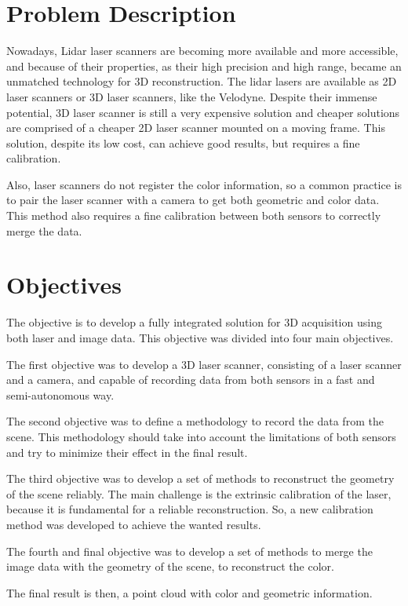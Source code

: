 \section{Problem Description}

Nowadays, Lidar laser scanners are becoming more available and more accessible,  and because of their properties, as their high precision and high range, became an unmatched technology for 3D reconstruction. The lidar lasers are available as 2D laser scanners or 3D laser scanners, like the Velodyne. Despite their immense potential, 3D laser scanner is still a very expensive solution and cheaper solutions are comprised of a cheaper 2D laser scanner mounted on a moving frame. This solution, despite its low cost, can achieve good results, but requires a fine calibration. 

Also, laser scanners do not register the color information, so a common practice is to pair the laser scanner with a camera to get both geometric and color data. This method also requires a fine calibration between both sensors to correctly merge the data. 

\section{Objectives}

The objective is to develop a fully integrated solution for 3D acquisition using both laser and image data. This objective was divided into four main objectives.

The first objective was to develop a 3D laser scanner, consisting of a laser scanner and a camera, and capable of recording data from both sensors in a fast and semi-autonomous way.

The second objective was to define a methodology to record the data from the scene. This methodology should take into account the limitations of both sensors and try to minimize their effect in the final result.

The third objective was to develop a set of methods to reconstruct the geometry of the scene reliably. The main challenge is the extrinsic calibration of the laser, because it is fundamental for a reliable reconstruction. So, a new calibration method was developed to achieve the wanted results.

The fourth and final objective was to develop a set of methods to merge the image data with the geometry of the scene, to reconstruct the color.

The final result is then, a point cloud with color and geometric information.

